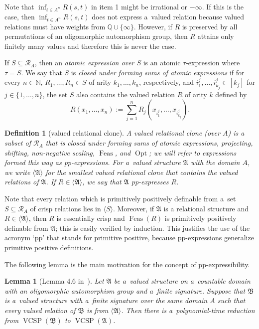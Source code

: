 \documentclass[preprint,12pt]{elsarticle}
\newcommand{\N}{\mathbb N}
\newcommand{\bA}{{\mathfrak A}}
\newcommand{\bB}{{\mathfrak B}}
\newcommand{\checked}[1]{#1}
\DeclareMathOperator{\VCSP}{VCSP}
\DeclareMathOperator{\Opt}{Opt}
\DeclareMathOperator{\Feas}{Feas}
\newtheorem{lemma}[theorem]{Lemma}
\newtheorem{definition}[theorem]{Definition}
\begin{document}
Note that $\inf_{t \in A^n} R(s,t)$ in item 1 might be irrational or $-\infty$.
If this is the
case, then $\inf_{t \in A^n} R(s,t)$ does not express a~valued relation
because valued relations must have weights from ${\mathbb Q} \cup \{\infty\}$.
However, if $R$ is preserved by all permutations of
an oligomorphic automorphism group, then $R$ 
attains only finitely many values and therefore this is never the case.

If $S \subseteq \mathscr{R}_A$, then an \emph{atomic expression over $S$} is an atomic $\tau$-expression where $\tau=S$. We say that $S$ is \emph{closed under forming sums of atomic expressions} if 
for every $n \in \N$, $R_1, \dots, R_n \in S$ of arity $k_1, \dots, k_n$, respectively, and $i_1^j, \dots, i_{k_j}^j \in [k_j]$ for $j \in \{1, \dots, n \}$, the set $S$ also contains the valued relation $R$ of arity $k$ defined by
\[R(x_1, \dots, x_n) := \sum_{j=1}^n R_j(x_{i_1^j}, \dots, x_{i_{k_j}^j}).\]


\begin{definition}[valued relational clone]\label{def:wrelclone}
A \emph{valued relational clone (over $A$)} is 
a subset of 
${\mathscr R}_A$ 
that 
is closed under forming sums of atomic expressions,
projecting, shifting, non-negative scaling, $\Feas$, and $\Opt$; \checked{we will refer to expressions formed this way as \emph{pp-expressions}.}
For a~valued structure $\bA$ with the domain $A$,  
we write 
$\langle \bA \rangle$ for the smallest valued relational clone that contains the valued relations of $\bA$. 
If $R \in \langle \bA \rangle$, we say that $\bA$ \checked{\emph{pp-expresses}} $R$.
\end{definition}

Note that every relation which is primitively positively definable from a~set $S \subseteq {\mathscr R}_A$ of crisp relations lies in $\langle S \rangle$. Moreover, if $\bA$ is a relational structure and $R \in \langle \bA \rangle$, then $R$ is essentially crisp and $\Feas(R)$ is primitively positively definable from $\bA$; this is easily verified by induction. \checked{This justifies the use of the acronym `pp' that stands for primitive positive, because pp-expressions generalize primitive positive definitions.}

The following lemma is the main motivation for the concept of \checked{pp-}express\-ibility.

\begin{lemma}[Lemma 4.6 in~\cite{Resilience-VCSPs}] \label{lem:expr-reduce}
Let $\bA$ be a~valued structure on a~countable domain with an oligomorphic 
automorphism group and a~finite signature. 
Suppose that $\bB$ is a~valued structure with a~finite signature over the same domain $A$ such that every valued relation of $\bB$ is from $\langle \bA \rangle$. 
Then there is a~polynomial-time reduction from
$\VCSP(\bB)$ to $\VCSP(\bA)$.
\end{lemma}
\end{document}
